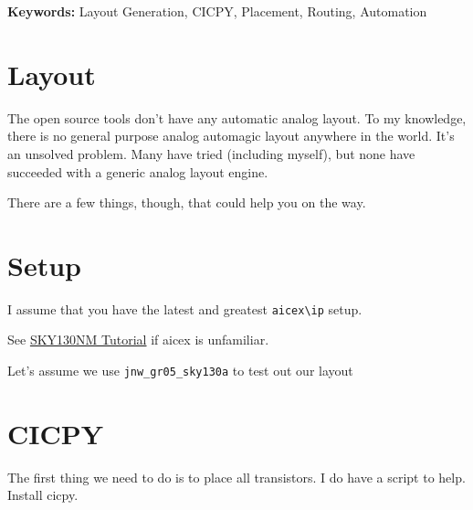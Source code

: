 \textbf{Keywords:} Layout Generation, CICPY, Placement, Routing,
Automation

\section{Layout}\label{layout}

The open source tools don't have any automatic analog layout. To my
knowledge, there is no general purpose analog automagic layout anywhere
in the world. It's an unsolved problem. Many have tried (including
myself), but none have succeeded with a generic analog layout engine.

There are a few things, though, that could help you on the way.

\section{Setup}\label{setup}

I assume that you have the latest and greatest
\texttt{aicex\textbackslash{}ip} setup.

See \href{https://analogicus.com/aic2026/sky130nm_tutorial}{SKY130NM
Tutorial} if aicex is unfamiliar.

Let's assume we use \texttt{jnw\_gr05\_sky130a} to test out our layout

\begin{Shaded}
\begin{Highlighting}[]
\end{Highlighting}
\end{Shaded}

\section{CICPY}\label{cicpy}

The first thing we need to do is to place all transistors. I do have a
script to help. Install cicpy.

\begin{Shaded}
\begin{Highlighting}[]
 
 
\end{Highlighting}
\end{Shaded}

